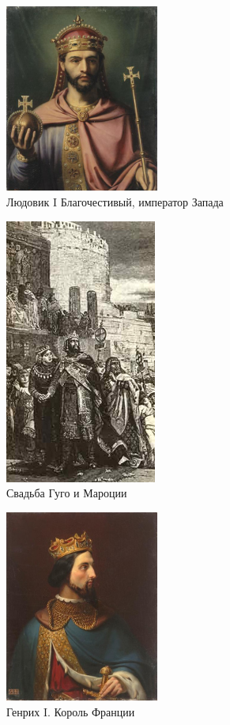 \begin{figure}[ht]
    \centering
    \includegraphics[width=0.45\textwidth]{img/europe/Louis_le_Pieux.png}
    \caption{Людовик I Благочестивый, император Запада}
    \label{fig:louis}
\end{figure}

\begin{figure}[ht]
    \centering
    \includegraphics{img/europe/Marozia_bertolini.jpg}
    \caption{Свадьба Гуго и Мароции}
    \label{fig:gugo}
\end{figure}

\begin{figure}[ht]
    \centering
    \includegraphics[width=0.45\textwidth]{img/europe/Blondel_-_Henry_I_of_France.jpg}
    \caption{Генрих I. Король Франции}
    \label{fig:henry}
\end{figure}

